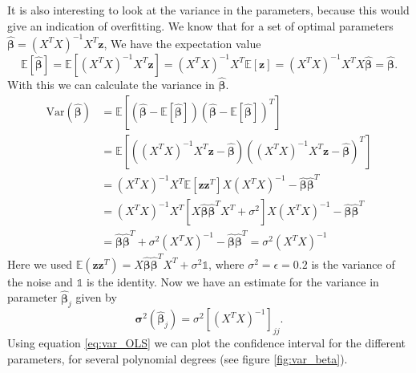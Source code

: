 \documentclass[reprint,english,notitlepage,aps,nobalancelastpage,nofootinbib]{revtex4-1}  %
\newcommand{\vc}[1]{\mathbf{#1}}
\begin{document}
It is also interesting to look at the variance in the parameters, because this would give an indication of overfitting. We know that for a set of optimal parameters
$\boldsymbol{\hat{\beta}} = (X^TX)^{-1}X^T \vc{z}$,
We have the expectation value
\begin{equation*}
	\mathbb{E}[\boldsymbol{\hat{\beta}}] = \mathbb{E}[(X^TX)^{-1}X^T \vc{z}] = (X^TX)^{-1}X^T\mathbb{E}[\vc{z}] = (X^TX)^{-1}X^TX\boldsymbol{\hat{\beta}} = \boldsymbol{\hat{\beta}}.
\end{equation*}
With this we can calculate the variance in $\boldsymbol{\hat{\beta}}$.
\begin{align*}
	\text{Var}(\boldsymbol{\hat{\beta}}) &= \mathbb{E}\left[(\boldsymbol{\hat{\beta}} - \mathbb{E}[\boldsymbol{\hat{\beta}}])(\boldsymbol{\hat{\beta}} - \mathbb{E}[\boldsymbol{\hat{\beta}}])^T\right] \\
	&= \mathbb{E}\left[((X^TX)^{-1}X^T\vc{z}- \boldsymbol{\hat{\beta}})((X^TX)^{-1}X^T\vc{z}- \boldsymbol{\hat{\beta}})^T\right] \\
	&= (X^TX)^{-1}X^T \mathbb{E}\left[\vc{z}\vc{z}^T\right]X(X^TX)^{-1}- \boldsymbol{\hat{\beta}}\boldsymbol{\hat{\beta}}^T \\
	&= (X^TX)^{-1}X^T\left[X\boldsymbol{\hat{\beta}}\boldsymbol{\hat{\beta}}^TX^T + \sigma^2 \right] X (X^TX)^{-1} - \boldsymbol{\hat{\beta}}\boldsymbol{\hat{\beta}}^T \\
	&= \boldsymbol{\hat{\beta}}\boldsymbol{\hat{\beta}}^T + \sigma^2(X^TX)^{-1} - \boldsymbol{\hat{\beta}}\boldsymbol{\hat{\beta}}^T = \sigma^2(X^TX)^{-1}
\end{align*}
Here we used $\mathbb{E} (\vc{z}\vc{z}^T) = X \boldsymbol{\hat{\beta}}\boldsymbol{\hat{\beta}}^T X^T + \sigma^2\mathbb{1}$, where $\sigma^2 = \epsilon = 0.2$ is the variance of the noise and $\mathbb{1}$ is the identity. Now we have an estimate for the variance in parameter $\boldsymbol{\hat{\beta}}_{j}$ given by
\begin{equation}
	\boldsymbol{\sigma}^2(\boldsymbol{\hat{\beta}}_{j}) = \sigma^2 [(X^TX)^{-1}]_{jj}.
	\label{eq:var_OLS}
\end{equation}
Using equation \eqref{eq:var_OLS} we can plot the confidence interval for the different parameters, for several polynomial degrees (see figure \ref{fig:var_beta}).
\end{document}
